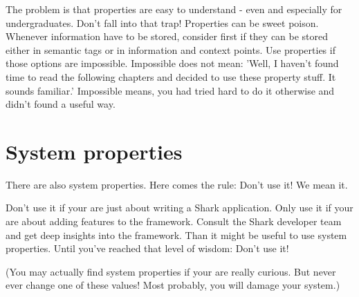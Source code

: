 The problem is that properties are easy to understand - even and especially for undergraduates. Don't fall into that trap! Properties can be sweet poison. Whenever information have to be stored, consider first if they can be stored either in semantic tags or in information and context points. Use properties if those options are impossible. Impossible does not mean: 'Well, I haven't found time to read the following chapters and decided to use these property stuff. It sounds familiar.' Impossible means, you had tried hard to do it otherwise and didn't found a useful way.

\section{System properties}
There are also system properties. Here comes the rule: Don't use it! We mean it. 

Don't use it if your are just about writing a Shark application. Only use it if your are about adding features to the framework. Consult the Shark developer team and get deep insights into the framework. Than it might be useful to use system properties. Until you've reached that level of wisdom: Don't use it!

(You may actually find system properties if your are really curious. But never ever change one of these values! Most probably, you will damage your system.)
        
